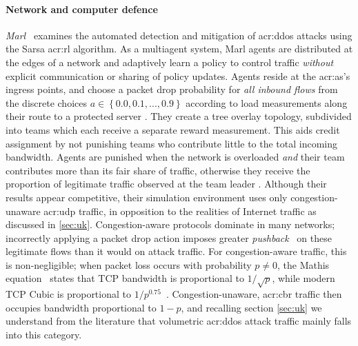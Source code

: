 \paragraph{Network and computer defence}
\emph{Marl}~\parencite{DBLP:conf/iaai/MalialisK13,DBLP:journals/eaai/MalialisK15} examines the automated detection and mitigation of \gls{acr:ddos} attacks using the Sarsa \gls{acr:rl} algorithm.
As a multiagent system, Marl agents are distributed at the edges of a network and adaptively learn a policy to control traffic \emph{without} explicit communication or sharing of policy updates.
Agents reside at the \gls{acr:as}'s ingress points, and choose a packet drop probability for \emph{all inbound flows} from the discrete choices $a\in\left\{0.0,0.1,...,0.9\right\}$ \prllitact{} according to load measurements along their route to a protected server \prllitstate.
They create a tree overlay topology, subdivided into teams which each receive a separate reward measurement.
This aids credit assignment by not punishing teams who contribute little to the total incoming bandwidth.
Agents are punished when the network is overloaded \emph{and} their team contributes more than its fair share of traffic, otherwise they receive the proportion of legitimate traffic observed at the team leader \prllitreward.
Although their results appear competitive, their simulation environment uses only congestion-unaware \gls{acr:udp} traffic, in opposition to the realities of Internet traffic as discussed in \cref{sec:uk}.
Congestion-aware protocols dominate in many networks; incorrectly applying a packet drop action imposes greater \emph{pushback}~\parencite{DBLP:journals/ccr/MahajanBFIPS02a} on these legitimate flows than it would on attack traffic.
For congestion-aware traffic, this is non-negligible; when packet loss occurs with probability $p\ne0$, the Mathis equation~\parencite{DBLP:journals/ccr/MathisSMO97} states that TCP bandwidth is proportional to $1/\sqrt{p}$, while modern TCP Cubic is proportional to $1/p^{0.75}$~\parencite{rfc8312}.
Congestion-unaware, \gls{acr:cbr} traffic then occupies bandwidth proportional to $1 - p$, and recalling section \cref{sec:uk} we understand from the literature that volumetric \gls{acr:ddos} attack traffic mainly falls into this category.
